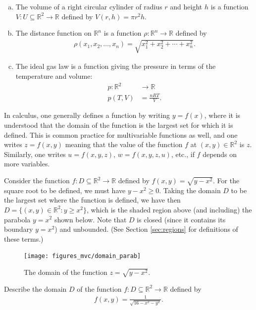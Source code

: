 \documentclass[12pt,letterpaper,reqno]{article}
\numberwithin{equation}{section}
\newcommand{\R}{\ensuremath{\mathbb R}}
\begin{document}
{\begin{example}
\begin{enumerate}[(a)]
	\item The volume of a right circular cylinder of radius $r$ and height $h$ is a function $V:U \subseteq \R^2 \to \R$ defined by $V(r,h)=\pi r^2h$.
	\item The distance function on $\R^n$ is a function $\rho:\R^n \to \R$ defined by
	\begin{align*}
	\rho(x_1,x_2,\dots,x_n)=\sqrt{x_1^2+x_2^2+\cdots+x_n^2}.
	\end{align*}
	\item The ideal gas law is a function giving the pressure in terms of the temperature and volume:
	\begin{align*} 
		p:\R^2 &\to \R\\
		p(T,V)&=\frac{nRT}{V}.
	\end{align*}
\end{enumerate}	
\end{example}
In calculus, one generally defines a function by writing $y=f(x)$, where it is understood that the domain of the function is the largest set for which it is defined. This is common practice for multivariable functions as well, and one writes $z=f(x,y)$ meaning that the value of the function $f$ at $(x,y) \in \R^2$ is $z$. Similarly, one writes $u=f(x,y,z)$, $w=f(x,y,z,u)$, etc., if $f$ depends on more variables.

\begin{example}\label{ex:parab_blue}
Consider the function $f:D \subseteq \R^2 \to \R$ defined by $f(x,y)=\sqrt{y-x^2}$. For the square root to be defined, we must have $y-x^2\geq 0$. Taking the domain $D$ to be the largest set where the function is defined, we have then $D=\{(x,y) \in \R^2:y \geq x^2\}$, which is the shaded region above (and including) the parabola $y=x^2$ shown below. Note that $D$ is closed (since it contains its boundary $y=x^2$) and unbounded. (See Section \ref{sec:regions} for definitions of these terms.)
\begin{figure}[h]
	\begin{center}
		\texttt{[image: figures\_mvc/domain\_parab]}
	\end{center}
	\caption{The domain of the function $z=\sqrt{y-x^2}$.}
\end{figure}
\end{example}

\begin{exercise}\label{exer:green_circ}
Describe the domain $D$ of the function $f:D \subseteq \R^2 \to \R$ defined by 
\begin{align*}
	f(x,y)=\frac{1}{\sqrt{16-x^2-y^2}}.
\end{align*}	
\end{exercise}

}
\end{document}
